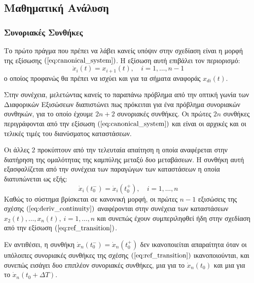 \subsection{Μαθηματική Ανάλυση}
\subsubsection{Συνοριακές Συνθήκες}
Το πρώτο πράγμα που πρέπει να λάβει κανείς υπόψιν στην σχεδίαση είναι η μορφή της εξίσωσης $(\ref{eq:canonical_system})$. Η εξίσωση αυτή επιβάλει τον περιορισμό:
\begin{equation*}
	\dot{x}_{i}(t) = x_{i+1}(t), \quad i=1,\dots,n-1
\end{equation*}
ο οποίος προφανώς θα πρέπει να ισχύει και για τα σήματα αναφοράς $x_{di}(t)$. 

Στην συνέχεια, μελετώντας κανείς το παραπάνω πρόβλημα από την οπτική γωνία των Διαφορικών Εξισώσεων διαπιστώνει πως πρόκειται για ένα πρόβλημα συνοριακών συνθηκών, για το οποίο έχουμε $2n+2$ συνοριακές συνθήκες. Οι πρώτες $2n$ συνθήκες περιγράφονται από την εξίσωση $(\ref{eq:canonical_system})$ και είναι οι αρχικές και οι τελικές τιμές του διανύσματος καταστάσεων.

Οι άλλες $2$ προκύπτουν από την τελευταία απαίτηση η οποία αναφέρεται στην διατήρηση της ομαλότητας της καμπύλης μεταξύ δυο μεταβάσεων. Η συνθήκη αυτή εξασφαλίζεται από την συνέχεια των παραγώγων των καταστάσεων η οποία διατυπώνεται ως εξής:
\begin{equation}
	\dot{x}_{i}(t_0^-) = \dot{x}_{i}(t_0^+), \quad i=1,\dots,n
	\label{eq:deriv_continuity}
\end{equation}
Καθώς το σύστημα βρίσκεται σε κανονική μορφή, οι πρώτες $n-1$ εξισώσεις της σχέσης $(\ref{eq:deriv_continuity})$ αναφέρονται στην συνέχεια των καταστάσεων $x_2(t), \dots, x_n(t), \: i=1,\dots,n$ και συνεπώς έχουν συμπεριληφθεί ήδη στην σχεδίαση από την εξίσωση $(\ref{eq:ref_transition})$. 

Εν αντιθέσει, η συνθήκη $\dot{x}_{n}(t_0^-) = \dot{x}_{n}(t_0^+)$ δεν ικανοποιείται απαραίτητα όταν οι υπόλοιπες συνοριακές συνθήκες της σχέσης $(\ref{eq:ref_transition})$ ικανοποιούνται, και συνεπώς εισάγει δυο επιπλέον συνοριακές συνθήκες, μια για το $\dot{x}_{n}(t_0)$ και μια για το $\dot{x}_{n}(t_0+\Delta T)$.

